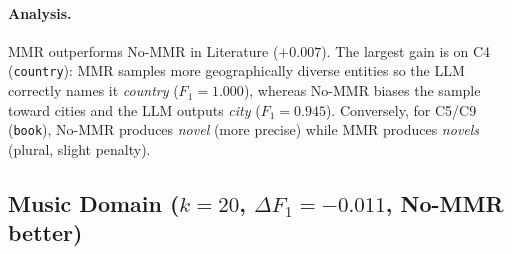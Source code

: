 \documentclass[11pt,a4paper]{article}
\begin{document}
\paragraph{Analysis.}
MMR outperforms No-MMR in Literature ($+0.007$).
The largest gain is on C4 (\texttt{country}): MMR samples more geographically diverse entities so the LLM correctly names it \textit{country} ($F_1 = 1.000$), whereas No-MMR biases the sample toward cities and the LLM outputs \textit{city} ($F_1 = 0.945$).
Conversely, for C5/C9 (\texttt{book}), No-MMR produces \textit{novel} (more precise) while MMR produces \textit{novels} (plural, slight penalty).

\FloatBarrier

\subsection{Music Domain ($k = 20$, $\Delta F_1 = -0.011$, No-MMR better)}
\end{document}
